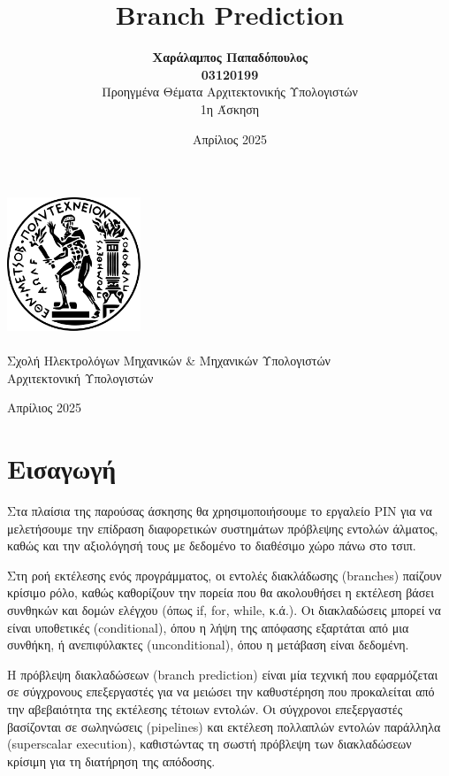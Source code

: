 \documentclass{article}
\title{\Huge Branch Prediction}
\author{
  \textbf{Χαράλαμπος Παπαδόπουλος\\ 03120199} \\[3cm]
  {Προηγμένα Θέματα Αρχιτεκτονικής Υπολογιστών\\ 1η Άσκηση} \\
}
\date{Απρίλιος 2025}
\begin{document}
\begin{titlepage}
    \centering
    \vspace{3cm}

    \includegraphics[width=4cm]{figures/emp.png}\\
    \vspace{1.5cm}
    {\fontsize{24pt}{20pt}\selectfont{Εθνικό Μετσόβιο Πολυτεχνείο}}\\[0.3cm]
    {\fontsize{16pt}{18pt}\selectfont Σχολή Ηλεκτρολόγων Μηχανικών \& Μηχανικών Υπολογιστών}\\[0.3cm]
    {\fontsize{16pt}{18pt}\selectfont Αρχιτεκτονική Υπολογιστών}\\[2cm]

    {\Huge\bfseries \thetitle \par}
    \vspace{2cm}
    {\Large \theauthor \par}
    \vfill

    {\fontsize{15pt}{18pt}Απρίλιος 2025}
\end{titlepage}


\newpage

\section{Εισαγωγή}

Στα πλαίσια της παρούσας άσκησης θα χρησιμοποιήσουμε το εργαλείο PIN για να μελετήσουμε την επίδραση διαφορετικών συστημάτων πρόβλεψης εντολών άλματος, καθώς και την αξιολόγησή τους με δεδομένο το διαθέσιμο χώρο πάνω στο τσιπ.

Στη ροή εκτέλεσης ενός προγράμματος, οι εντολές διακλάδωσης (branches) παίζουν κρίσιμο ρόλο, καθώς καθορίζουν την πορεία που θα ακολουθήσει η εκτέλεση βάσει συνθηκών και δομών ελέγχου (όπως if, for, while, κ.ά.). Οι διακλαδώσεις μπορεί να είναι υποθετικές (conditional), όπου η λήψη της απόφασης εξαρτάται από μια συνθήκη, ή ανεπιφύλακτες (unconditional), όπου η μετάβαση είναι δεδομένη.

Η πρόβλεψη διακλαδώσεων (branch prediction) είναι μία τεχνική που εφαρμόζεται σε σύγχρονους επεξεργαστές για να μειώσει την καθυστέρηση που προκαλείται από την αβεβαιότητα της εκτέλεσης τέτοιων εντολών. Οι σύγχρονοι επεξεργαστές βασίζονται σε σωληνώσεις (pipelines) και εκτέλεση πολλαπλών εντολών παράλληλα (superscalar execution), καθιστώντας τη σωστή πρόβλεψη των διακλαδώσεων κρίσιμη για τη διατήρηση της απόδοσης.
\end{document}
